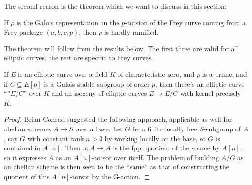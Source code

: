 \begin{corollary}
\begin{corollary}
%
%
%

The second reason is the theorem which we want to discuss in this section:

\begin{theorem}\label{frey_curve_hardly_ramified} If $\rho$ is the Galois representation on the $p$-torsion of the Frey curve coming from a Frey package $(a,b,c,p)$, then $\rho$ is hardly ramified.
\end{theorem}

The theorem will follow from the results below. The first three are valid for all elliptic curves, the rest are specific to Frey curves.




\begin{theorem}\label{Elliptic_curve_quotient_by_finite_subgroup} If $E$ is an elliptic curve over a field $K$ of characteristic zero, and $p$ is a prime, and if $C\subseteq E[p]$ is a Galois-stable
  subgroup of order $p$, then there's an elliptic curve ``''$E/C$'' over $K$ and an isogeny of elliptic curves $E\to E/C$ with kernel precisely $K$.
\end{theorem}
\begin{proof}
  Brian Conrad suggested the following approach, applicable as well for abelian schemes $A\to S$ over a base.  Let $G$ be a finite locally free $S$-subgroup of $A$, say $G$ with constant rank $n > 0$ by working locally on the base, so $G$ is contained in $A[n]$.  Then $n: A \to A$ is the fppf quotient of the source by $A[n]$, so it expresses $A$ as an $A[n]$-torsor over itself.  The problem of building $A/G$ as an abelian scheme is then seen to be the “same” as that of constructing the quotient of this $A[n]$-torsor by the G-action.


\end{proof}
\end{corollary}
\end{corollary}
